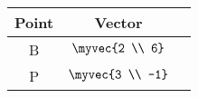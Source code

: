 \begin{tabular}[12pt]{ |c| c| c|} 
    \hline
    {Point} & {Vector} \\ 
    \hline
    B & $ \myvec{2 \\ 6} $  \\
    \hline
    P & $ \myvec{3 \\ -1} $   \\
    \hline  
    \end{tabular}